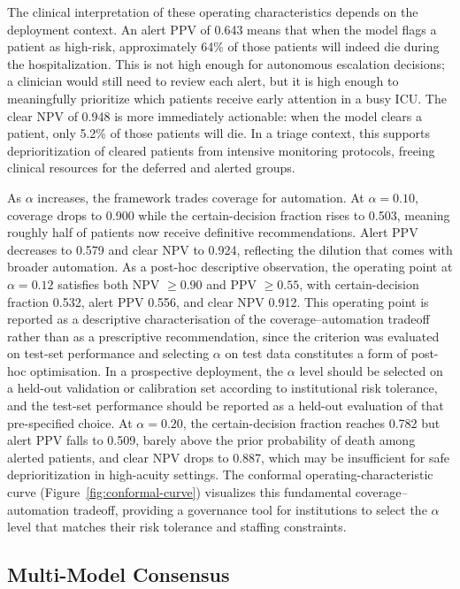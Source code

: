 The clinical interpretation of these operating characteristics depends on the deployment context. An alert PPV of 0.643 means that when the model flags a patient as high-risk, approximately 64\% of those patients will indeed die during the hospitalization. This is not high enough for autonomous escalation decisions; a clinician would still need to review each alert, but it is high enough to meaningfully prioritize which patients receive early attention in a busy ICU. The clear NPV of 0.948 is more immediately actionable: when the model clears a patient, only 5.2\% of those patients will die. In a triage context, this supports deprioritization of cleared patients from intensive monitoring protocols, freeing clinical resources for the deferred and alerted groups.

As $\alpha$ increases, the framework trades coverage for automation. At $\alpha=0.10$, coverage drops to 0.900 while the certain-decision fraction rises to 0.503, meaning roughly half of patients now receive definitive recommendations. Alert PPV decreases to 0.579 and clear NPV to 0.924, reflecting the dilution that comes with broader automation. As a post-hoc descriptive observation, the operating point at $\alpha=0.12$ satisfies both NPV $\geq 0.90$ and PPV $\geq 0.55$, with certain-decision fraction 0.532, alert PPV 0.556, and clear NPV 0.912. This operating point is reported as a descriptive characterisation of the coverage--automation tradeoff rather than as a prescriptive recommendation, since the criterion was evaluated on test-set performance and selecting $\alpha$ on test data constitutes a form of post-hoc optimisation. In a prospective deployment, the $\alpha$ level should be selected on a held-out validation or calibration set according to institutional risk tolerance, and the test-set performance should be reported as a held-out evaluation of that pre-specified choice. At $\alpha=0.20$, the certain-decision fraction reaches 0.782 but alert PPV falls to 0.509, barely above the prior probability of death among alerted patients, and clear NPV drops to 0.887, which may be insufficient for safe deprioritization in high-acuity settings. The conformal operating-characteristic curve (Figure~\ref{fig:conformal-curve}) visualizes this fundamental coverage--automation tradeoff, providing a governance tool for institutions to select the $\alpha$ level that matches their risk tolerance and staffing constraints.

\subsection{Multi-Model Consensus}

